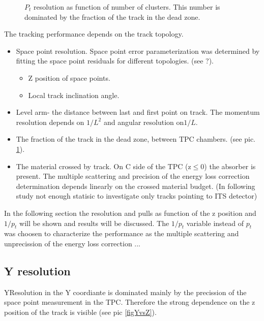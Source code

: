 \documentclass{elsart}
\begin{document}
\begin{figure}
  \centering{}
  \centering{}
  \caption{$P_{t}$ resolution as function of number of clusters. This number is dominated 
     by the fraction of the track in the dead zone.}
  \label{figPtResNCL}
\end{figure}

The tracking performance depends on the track topology.
\begin{itemize}
\item Space point resolution. Space point error parameterization was determined by fitting the space point residuals for different topologies. (see ?).
\begin{itemize} 
\item Z position of space points. 
\item Local track inclination angle.
\end{itemize} 
\item Level arm- the distance between last and first point on track. 
      The momentum resolution depends on $1/L^2$ and angular resolution on$1/L$.
\item The fraction of the track in the dead zone, between TPC chambers.
      (see pic. \ref{figPtResNCL}).   
\item The material crossed by track. On C side of the TPC (z$\leq$0) the absorber is present.
      The multiple scattering and precision of the energy loss correction determination depends linearly on the crossed material budget. (In following study not enough statisic to investigate only tracks pointing to ITS detector)  
\end{itemize}


In the following section the resolution and pulls  as function of the z position and $1/p_{t}$ will be shown and results will be discussed. The $1/p_{t}$  variable instead of $p_{t}$ was choosen to characterize the performance as the multiple scattering and unprecission of the energy loss correction  ...


\subsection { Y resolution}

YResolution in the Y coordiante is dominated mainly by the precission of the space point measurement in the TPC. Therefore the strong dependence on the z position of the track is visible (see pic \ref{figYvsZ}). 
\end{document}
